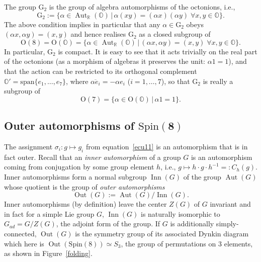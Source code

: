 \documentclass[pdftex]{sigma}
\numberwithin{equation}{section}
\newcommand{\Aut}{\operatorname{Aut}}
\newcommand{\Oct}{{\mathbb O}}
\begin{document}
The group $\mathrm{G}_2$ is the group of algebra automorphisms of the octonions, i.e.,
\begin{equation*}
\mathrm{G}_2 := \{ \alpha \in \Aut_\mathbb{R}(\Oct) \, | \, \alpha (xy) = (\alpha x )(\alpha y) \; \forall x,y \in \Oct \}.
\end{equation*}
The above condition implies in particular that any $\alpha \in \mathrm{G}_2$ obeys $(\alpha x , \alpha y) = (x,y)$ and hence realises $\mathrm{G}_2$ as a closed subgroup of
\begin{equation*}
\mathrm{O}(8) = \mathrm{O}(\Oct) = \{ \alpha \in \Aut_\mathbb{R}(\Oct) \, | \, (\alpha x , \alpha y) = (x,y) \; \forall x,y \in \Oct \}.
\end{equation*}
In particular, $\mathrm{G}_2$ is compact. It is easy to see that it acts trivially on the real part of the octonions (as a morphism of algebras it preserves the unit: $\alpha 1 = 1$), and that the action can be restricted to its orthogonal complement $\Oct' = \textrm{span}\{ e_1 , \dots , e_7 \}$, where $\overline{\alpha e_i} = -\alpha e_i$ ($i=1,\dots,7$), so that $\mathrm{G}_2$ is really a subgroup of
\begin{equation*}
\mathrm{O}(7) = \{ \alpha \in \mathrm{O}(\Oct) \, | \, \alpha 1 = 1 \}.
\end{equation*}

\subsection[Outer automorphisms of Spin(8)]{Outer automorphisms of $\boldsymbol{\mathrm{Spin}(8)}$}
 The assignment $\sigma_i\colon g \mapsto g_i$ from equation~\eqref{ecu11} is an automorphism that is in fact outer. Recall that an \textit{inner automorphism} of a group $G$ is an automorphism coming from conjugation by some group element $h$, i.e., $g \mapsto h \cdot g \cdot h^{-1} =: C_h(g)$. Inner automorphisms form a normal subgroup $\operatorname{Inn}(G)$ of the group $\operatorname{Aut}(G)$ whose quotient is the group of \textit{outer automorphisms}
 \[\operatorname{Out}(G) := \operatorname{Aut}(G) / \operatorname{Inn}(G).\] Inner automorphisms (by definition) leave the center $Z(G)$ of $G$ invariant and in fact for a simple Lie group $G$, $\operatorname{Inn}(G)$ is naturally isomorphic to $G_{ad} = G/Z(G)$, the adjoint form of the group. If $G$ is additionally simply-connected, $\operatorname{Out}(G)$ is the symmetry group of its associated Dynkin diagram which here is $\operatorname{Out}(\mathrm{Spin}(8)) \simeq S_3$, the group of permutations on 3 elements, as shown in Figure~\ref{folding}.
\end{document}
